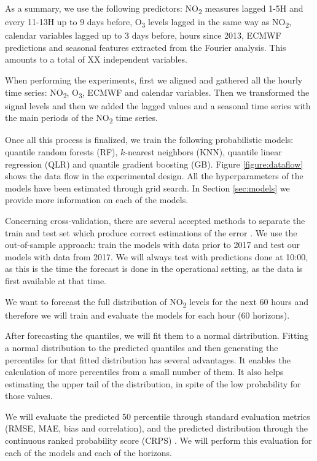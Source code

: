 \documentclass[a4paper,twocolumn,5p]{elsarticle}
\begin{document}
As a summary, we use the following predictors: NO\textsubscript{2}
measures lagged 1-5H and every 11-13H up to 9 days before,
O\textsubscript{3} levels lagged in the same way as
NO\textsubscript{2}, calendar variables lagged up to 3 days before,
hours since 2013, ECMWF predictions and seasonal features extracted
from the Fourier analysis. This amounts to a total of XX independent
variables. 

When performing the experiments, first we aligned and gathered all the
hourly time series: NO\textsubscript{2}, O\textsubscript{3}, ECMWF and
calendar variables.  Then we transformed the signal levels and then we
added the lagged values and a seasonal time series with the main
periods of the NO\textsubscript{2} time series.

Once all this process is finalized, we train the following
probabilistic models: quantile random forests (RF), $k$-nearest
neighbors (KNN), quantile linear regression (QLR) and quantile
gradient boosting (GB).  Figure \ref{figure:dataflow} shows the data
flow in the experimental design. All the hyperparameters of the models
have been estimated through grid search.  In Section \ref{sec:models}
we provide more information on each of the models.

Concerning cross-validation, there are several accepted methods to
separate the train and test set which produce correct estimations of
the error \cite{bergmeir_note_2018}. We use the out-of-sample
approach: train the models with data prior to 2017 and test our models
with data from 2017. We will always test with predictions done at
10:00, as this is the time the forecast is done in the operational
setting, as the data is first available at that time.

We want to forecast the full distribution of NO\textsubscript{2}
levels for the next 60 hours and therefore we will train and evaluate
the models for each hour (60 horizons).

After forecasting the quantiles, we will fit them to a normal
distribution. Fitting a normal distribution to the predicted quantiles
and then generating the percentiles for that fitted distribution has
several advantages. It enables the calculation of more percentiles
from a small number of them.  It also helps estimating the upper tail
of the distribution, in spite of the low probability for those values.

We will evaluate the predicted 50 percentile through standard
evaluation metrics (RMSE, MAE, bias and correlation), and the predicted
distribution through the continuous ranked probability score (CRPS)
. We will perform this evaluation for
each of the models and each of the horizons.
\end{document}
